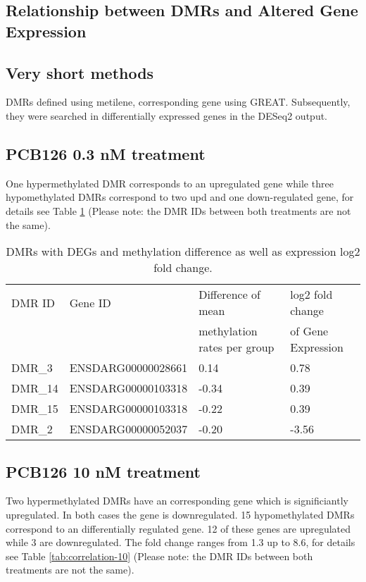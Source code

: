\documentclass{article}
\newcommand{\TODO}[1]{\begingroup\color{red}Todo: #1\endgroup}
\begin{document}

\subsection{Relationship between DMRs and Altered Gene Expression}

\subsection{Very short methods}
DMRs defined using metilene, corresponding gene using
GREAT. Subsequently, they were searched in differentially expressed
genes in the DESeq2 output.

\subsection{PCB126 0.3 nM treatment}
One hypermethylated DMR corresponds to an upregulated gene while three
hypomethylated DMRs correspond to two upd and one down-regulated gene,
for details see Table \ref{tab:correlation-0.3} (Please note: the DMR
IDs between both treatments are not the same).

\begin{table}
  \begin{tabular}{llll}
    DMR ID & Gene ID & Difference of mean  & log2 fold change\\
           &         & methylation rates per group & of Gene Expression \\
    \hline
    DMR\_3 & ENSDARG00000028661 & 0.14 & 0.78\\
    \hline
    DMR\_14 & ENSDARG00000103318 & -0.34 & 0.39\\
    DMR\_15 & ENSDARG00000103318 & -0.22 & 0.39\\
    DMR\_2 & ENSDARG00000052037 & -0.20 & -3.56\\
  \end{tabular}
  \caption{DMRs with DEGs and methylation difference as well as
    expression log2 fold change.}
  \label{tab:correlation-0.3}
\end{table}

\subsection{PCB126 10 nM treatment}
Two hypermethylated DMRs have an corresponding gene which is
significiantly upregulated. In both cases the gene is
downregulated. 15 hypomethylated DMRs correspond to an differentially
regulated gene. 12 of these genes are upregulated while 3 are
downregulated. The fold change ranges from 1.3 up to 8.6, for details
see Table \ref{tab:correlation-10} (Please note: the DMR IDs between
both treatments are not the same).
\end{document}
